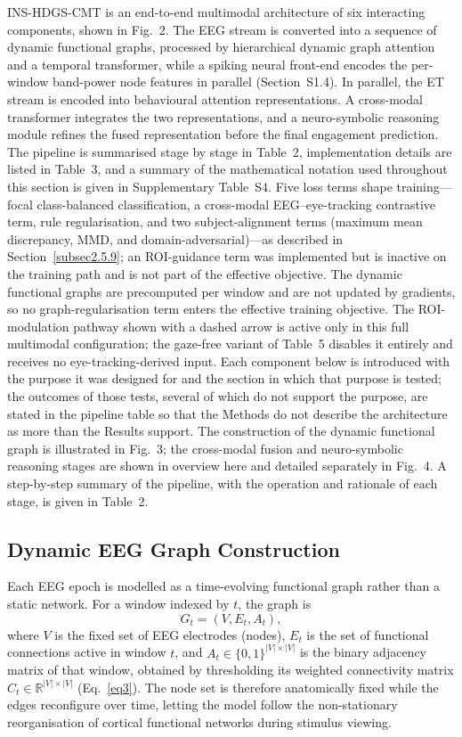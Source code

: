 \documentclass[pdflatex,sn-basic,Numbered]{sn-jnl}
\begin{document}
INS-HDGS-CMT is an end-to-end multimodal architecture of six interacting components, shown in Fig.~2. The EEG stream is converted into a sequence of dynamic functional graphs, processed by hierarchical dynamic graph attention and a temporal transformer, while a spiking neural front-end encodes the per-window band-power node features in parallel (Section~S1.4). In parallel, the ET stream is encoded into behavioural attention representations. A cross-modal transformer integrates the two representations, and a neuro-symbolic reasoning module refines the fused representation before the final engagement prediction. The pipeline is summarised stage by stage in Table~2, implementation details are listed in Table~3, and a summary of the mathematical notation used throughout this section is given in Supplementary Table~S4. Five loss terms shape training---focal class-balanced classification, a cross-modal EEG--eye-tracking contrastive term, rule regularisation, and two subject-alignment terms (maximum mean discrepancy, MMD, and domain-adversarial)---as described in Section~\ref{subsec2.5.9}; an ROI-guidance term was implemented but is inactive on the training path and is not part of the effective objective. The dynamic functional graphs are precomputed per window and are not updated by gradients, so no graph-regularisation term enters the effective training objective. The ROI-modulation pathway shown with a dashed arrow is active only in this full multimodal configuration; the gaze-free variant of Table~5 disables it entirely and receives no eye-tracking-derived input. Each component below is introduced with the purpose it was designed for and the section in which that purpose is tested; the outcomes of those tests, several of which do not support the purpose, are stated in the pipeline table so that the Methods do not describe the architecture as more than the Results support. The construction of the dynamic functional graph is illustrated in Fig.~3; the cross-modal fusion and neuro-symbolic reasoning stages are shown in overview here and detailed separately in Fig.~4. A step-by-step summary of the pipeline, with the operation and rationale of each stage, is given in Table~2.

\subsection{Dynamic EEG Graph Construction}\label{subsec2.5.2}

Each EEG epoch is modelled as a time-evolving functional graph rather than a static network. For a window indexed by $t$, the graph is
\begin{equation}
G_t = (V, E_t, A_t), \label{eq1}
\end{equation}
where $V$ is the fixed set of EEG electrodes (nodes), $E_t$ is the set of functional connections active in window $t$, and $A_t \in \{0,1\}^{|V|\times|V|}$ is the binary adjacency matrix of that window, obtained by thresholding its weighted connectivity matrix $C_t \in \mathbb{R}^{|V|\times|V|}$ (Eq.~\eqref{eq3}). The node set is therefore anatomically fixed while the edges reconfigure over time, letting the model follow the non-stationary reorganisation of cortical functional networks during stimulus viewing.
\end{document}
